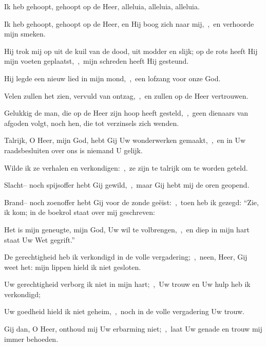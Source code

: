 \documentclass[12pt,twoside,a5paper]{article}
\begin{document}





\begin{halfparskip}
  Ik heb gehoopt, gehoopt op de Heer, alleluia, alleluia, alleluia.

  Ik heb gehoopt, gehoopt op de Heer, en Hij boog zich naar mij,~\sep\ en verhoorde mijn smeken.

  Hij trok mij op uit de kuil van de dood, uit modder en slijk; op de rots heeft Hij mijn voeten geplaatst,~\sep\ mijn schreden heeft Hij gesteund.

  Hij legde een nieuw lied in mijn mond,~\sep\ een lofzang voor onze God.

  Velen zullen het zien, vervuld van ontzag,~\sep\ en zullen op de Heer vertrouwen.

  Gelukkig de man, die op de Heer zijn hoop heeft gesteld,~\sep\ geen dienaars van afgoden volgt, noch hen, die tot verzinsels zich wenden.

  Talrijk, O Heer, mijn God, hebt Gij Uw wonderwerken gemaakt,~\sep\ en in Uw raadsbesluiten over ons is niemand U gelijk.

  Wilde ik ze verhalen en verkondigen:~\sep\ ze zijn te talrijk om te worden geteld.

  Slacht-- noch spijsoffer hebt Gij gewild,~\sep\ maar Gij hebt mij de oren geopend.

  Brand-- noch zoenoffer hebt Gij voor de zonde geëist:~\sep\ toen heb ik gezegd: ``Zie, ik kom; in de boekrol staat over mij geschreven:

  Het is mijn geneugte, mijn God, Uw wil te volbrengen,~\sep\ en diep in mijn hart staat Uw Wet gegrift.''

  De gerechtigheid heb ik verkondigd in de volle vergadering;~\sep\ neen, Heer, Gij weet het: mijn lippen hield ik niet gesloten.

  Uw gerechtigheid verborg ik niet in mijn hart;~\sep\ Uw trouw en Uw hulp heb ik verkondigd;

  Uw goedheid hield ik niet geheim,~\sep\ noch in de volle vergadering Uw trouw.

  Gij dan, O Heer, onthoud mij Uw erbarming niet;~\sep\ laat Uw genade en trouw mij immer behoeden.
\end{halfparskip}
\end{document}
